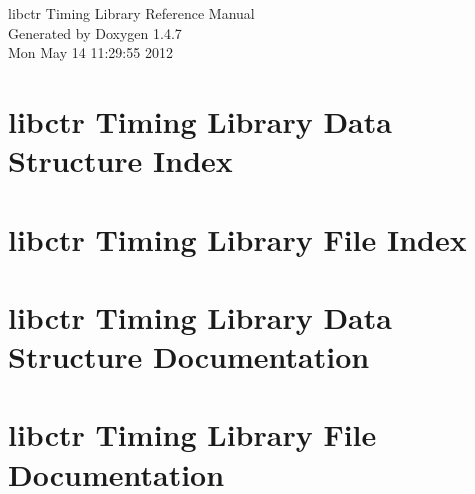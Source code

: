 \documentclass[a4paper]{book}
\begin{document}
\begin{titlepage}
\vspace*{7cm}
\begin{center}
{\Large libctr Timing Library Reference Manual}\\
\vspace*{1cm}
{\large Generated by Doxygen 1.4.7}\\
\vspace*{0.5cm}
{\small Mon May 14 11:29:55 2012}\\
\end{center}
\end{titlepage}
\clearemptydoublepage
{}
\tableofcontents
\clearemptydoublepage
{}
\chapter{libctr Timing Library Data Structure Index}

\chapter{libctr Timing Library File Index}

\chapter{libctr Timing Library Data Structure Documentation}




\chapter{libctr Timing Library File Documentation}

\printindex
\end{document}
